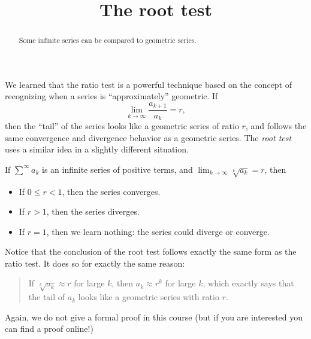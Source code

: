 \documentclass{ximera}
\title[Dig-In:]{The root test}
\begin{document}
\begin{abstract}
Some infinite series can be compared to geometric series.
\end{abstract}
\maketitle

We learned that the ratio test is a powerful technique based on the
concept of recognizing when a series is ``approximately'' geometric.
If
\[
\lim_{k \to \infty} \frac{a_{k+1}}{a_k} = r,
\]
then the ``tail'' of the series looks like a geometric series of ratio
$r$, and follows the same convergence and divergence behavior as a
geometric series.  The \textit{root test} uses a similar idea in a
slightly different situation.
\begin{theorem}
  If $\sum^\infty a_k$ is an infinite series of positive terms, and $\lim_{k \to \infty} \sqrt[k]{a_k} = r$, then 
  \begin{itemize}
  \item If $0 \leq r < 1$, then the series converges.
  \item If $r>1$, then the series diverges.
  \item If $r = 1$, then we learn nothing:  the series could diverge or converge.
  \end{itemize}
\end{theorem}
Notice that the conclusion of the root test follows exactly the same
form as the ratio test.  It does so for exactly the same reason:
\begin{quote}
  If $\sqrt[k]{a_k} \approx r$ for large $k$, then $a_k \approx r^k$
  for large $k$, which exactly says that the tail of $a_k$ looks like
  a geometric series with ratio $r$.
\end{quote}
Again, we do not give a formal proof in this course (but if you are
interested you can find a proof online!)
\end{document}
